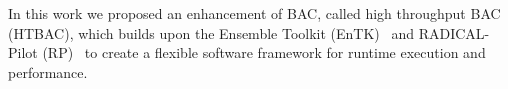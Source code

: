 
In this work we proposed an enhancement of BAC, called high throughput BAC
(HTBAC), which builds upon the Ensemble Toolkit (EnTK)~\cite{entk} and
RADICAL-Pilot (RP)~\cite{radical-pilot} to create a flexible software
framework for runtime execution and performance.
